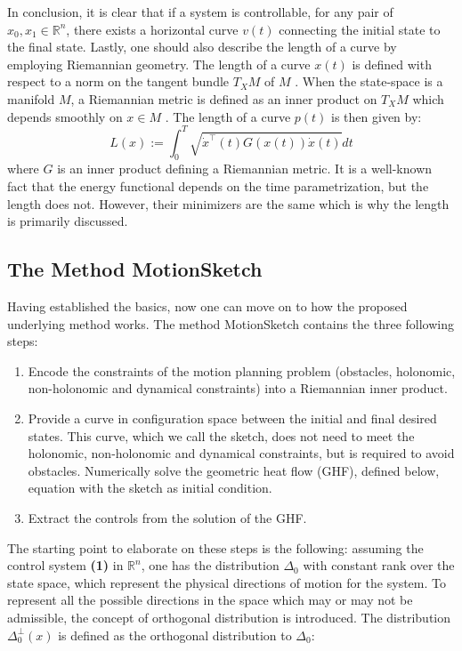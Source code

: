 \documentclass[letterpaper, 10 pt, conference]{ieeeconf}
\begin{document}
In conclusion, it is clear that if a system is controllable, for any pair of $x_0,x_1 \in \mathbb{R}^n$, there exists a horizontal curve $v(t)$ connecting the initial state to the final state. Lastly, one should also describe the length of a curve by employing Riemannian geometry. The length of a curve $x(t)$ is defined with respect to a norm on the tangent bundle $T_{X}M$ of $M$ \cite{PAPER2}. When the state-space is a manifold $M$, a Riemannian metric is defined as an inner product on $T_{X}M$ which depends smoothly on $x \in M$ \cite{PAPER1}. The length of a curve $p(t)$ is then given by:
\begin{equation}
L(x):=\int_{0}^{T} \sqrt{\dot{x}^{\top}(t) G(x(t)) \dot{x}(t)} d t
\end{equation}
where $G$ is an inner product defining a Riemannian metric. It is a well-known fact that the energy functional depends on the time parametrization, but the length does not. However, their minimizers are the same \cite{MATH4} which is why the length is primarily discussed.

\pagebreak
\subsection{The Method MotionSketch}

Having established the basics, now one can move on to how the proposed underlying method works. The method MotionSketch \cite{PAPER2} contains the three following steps:

\begin{enumerate}
  \item Encode the constraints of the motion planning problem (obstacles, holonomic, non-holonomic and dynamical constraints) into a Riemannian inner product.
  \item Provide a curve in configuration space between the initial and final desired states. This curve, which we call the sketch, does not need to meet the holonomic, non-holonomic and dynamical constraints, but is required to avoid obstacles. Numerically solve the geometric heat flow (GHF), defined below, equation with the sketch as initial condition.
  \item Extract the controls from the solution of the GHF. 
\end{enumerate}

The starting point to elaborate on these steps is the following: assuming the control system \textbf{(1)} in $\mathbb{R}^{n}$, one has the distribution $\Delta_{0}$ with constant rank over the state space, which represent the physical directions of motion for the system. To represent all the possible directions in the space which may or may not be admissible, the concept of orthogonal distribution is introduced. The distribution $\Delta_{0}^{\perp}(x)$ is defined as the orthogonal distribution to $\Delta_{0}$:
\end{document}
